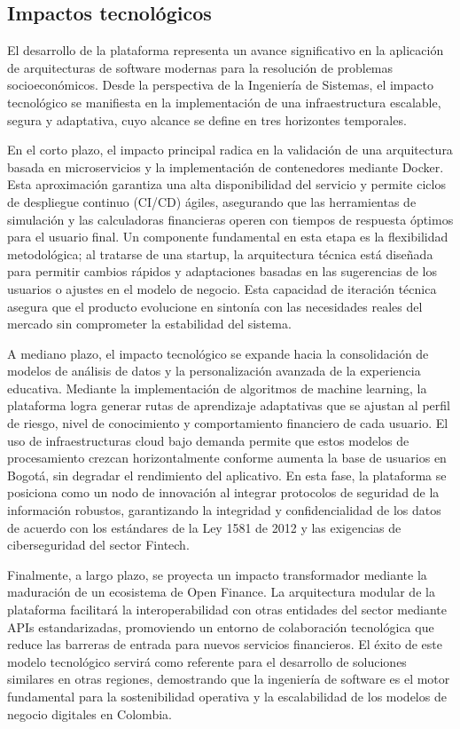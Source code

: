 {}
\subsection*{Impactos tecnológicos}


El desarrollo de la plataforma representa un avance significativo en la aplicación de arquitecturas de software modernas para la resolución de problemas socioeconómicos. Desde la perspectiva de la Ingeniería de Sistemas, el impacto tecnológico se manifiesta en la implementación de una infraestructura escalable, segura y adaptativa, cuyo alcance se define en tres horizontes temporales.

En el corto plazo, el impacto principal radica en la validación de una arquitectura basada en microservicios y la implementación de contenedores mediante Docker. Esta aproximación garantiza una alta disponibilidad del servicio y permite ciclos de despliegue continuo (CI/CD) ágiles, asegurando que las herramientas de simulación y las calculadoras financieras operen con tiempos de respuesta óptimos para el usuario final. Un componente fundamental en esta etapa es la flexibilidad metodológica; al tratarse de una startup, la arquitectura técnica está diseñada para permitir cambios rápidos y adaptaciones basadas en las sugerencias de los usuarios o ajustes en el modelo de negocio. Esta capacidad de iteración técnica asegura que el producto evolucione en sintonía con las necesidades reales del mercado sin comprometer la estabilidad del sistema.

A mediano plazo, el impacto tecnológico se expande hacia la consolidación de modelos de análisis de datos y la personalización avanzada de la experiencia educativa. Mediante la implementación de algoritmos de machine learning, la plataforma logra generar rutas de aprendizaje adaptativas que se ajustan al perfil de riesgo, nivel de conocimiento y comportamiento financiero de cada usuario. El uso de infraestructuras cloud bajo demanda permite que estos modelos de procesamiento crezcan horizontalmente conforme aumenta la base de usuarios en Bogotá, sin degradar el rendimiento del aplicativo. En esta fase, la plataforma se posiciona como un nodo de innovación al integrar protocolos de seguridad de la información robustos, garantizando la integridad y confidencialidad de los datos de acuerdo con los estándares de la Ley 1581 de 2012 y las exigencias de ciberseguridad del sector Fintech.

Finalmente, a largo plazo, se proyecta un impacto transformador mediante la maduración de un ecosistema de Open Finance. La arquitectura modular de la plataforma facilitará la interoperabilidad con otras entidades del sector mediante APIs estandarizadas, promoviendo un entorno de colaboración tecnológica que reduce las barreras de entrada para nuevos servicios financieros. El éxito de este modelo tecnológico servirá como referente para el desarrollo de soluciones similares en otras regiones, demostrando que la ingeniería de software es el motor fundamental para la sostenibilidad operativa y la escalabilidad de los modelos de negocio digitales en Colombia.
